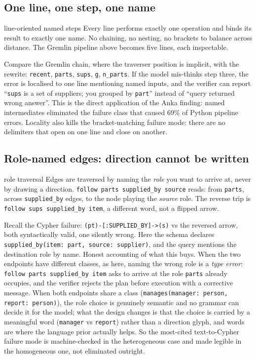 \documentclass[11pt]{article}
\begin{document}
\subsection{One line, one step, one name}

\begin{featurebox}{line-oriented named steps}
Every line performs exactly one operation and binds its result to exactly one name. No chaining, no nesting, no brackets to balance across distance. The Gremlin pipeline above becomes five lines, each inspectable.
\end{featurebox}

Compare the Gremlin chain, where the traverser position is implicit, with the rewrite: \texttt{recent}, \texttt{parts}, \texttt{sups}, \texttt{g}, \texttt{n\_parts}. If the model mis-thinks step three, the error is localised to one line mentioning named inputs, and the verifier can report ``\texttt{sups} is a set of suppliers; you grouped by \texttt{part}'' instead of ``query returned wrong answer''. This is the direct application of the Anka finding: named intermediates eliminated the failure class that caused 69\% of Python pipeline errors. Locality also kills the bracket-matching failure mode: there are no delimiters that open on one line and close on another.

\subsection{Role-named edges: direction cannot be written}

\begin{featurebox}{role traversal}
Edges are traversed by naming the \emph{role} you want to arrive at, never by drawing a direction. \texttt{follow parts supplied\_by source} reads: from \texttt{parts}, across \texttt{supplied\_by} edges, to the node playing the \emph{source} role. The reverse trip is \texttt{follow sups supplied\_by item}, a different word, not a flipped arrow.
\end{featurebox}

Recall the Cypher failure: \texttt{(pt)-[:SUPPLIED\_BY]->(s)} vs the reversed arrow, both syntactically valid, one silently wrong. Here the schema declares \texttt{supplied\_by(item: part, source: supplier)}, and the query mentions the destination role by name. Honest accounting of what this buys. When the two endpoints have different classes, as here, naming the wrong role is a \emph{type error}: \texttt{follow parts supplied\_by item} asks to arrive at the role \texttt{parts} already occupies, and the verifier rejects the plan before execution with a corrective message. When both endpoints share a class (\texttt{manages(manager: person, report: person)}), the role choice is genuinely semantic and no grammar can decide it for the model; what the design changes is that the choice is carried by a meaningful word (\texttt{manager} vs \texttt{report}) rather than a direction glyph, and words are where the language prior actually helps. So the most-cited text-to-Cypher failure mode is machine-checked in the heterogeneous case and made legible in the homogeneous one, not eliminated outright.
\end{document}
